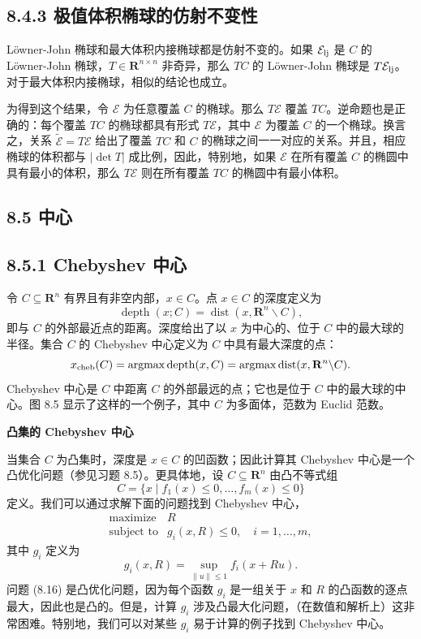 \documentclass[UTF8, 12pt, fontset=fandol, oneside]{ctexart}
\begin{document}
\subsection*{8.4.3 极值体积椭球的仿射不变性}

Löwner-John 椭球和最大体积内接椭球都是仿射不变的。如果 $\mathcal{E}_{\rm lj}$ 是 $C$ 的 Löwner-John 椭球，$T\in\mathbf{R}^{n\times n}$ 非奇异，那么 $TC$ 的 Löwner-John 椭球是 $T\mathcal{E}_{\rm lj}$。对于最大体积内接椭球，相似的结论也成立。

为得到这个结果，令 $\mathcal{E}$ 为任意覆盖 $C$ 的椭球。那么 $T\mathcal{E}$ 覆盖 $TC$。逆命题也是正确的：每个覆盖 $TC$ 的椭球都具有形式 $T\mathcal{E}$，其中 $\mathcal{E}$ 为覆盖 $C$ 的一个椭球。换言之，关系 $\tilde{\mathcal{E}}=T\mathcal{E}$ 给出了覆盖 $TC$ 和 $C$ 的椭球之间一一对应的关系。并且，相应椭球的体积都与 $|\det T|$ 成比例，因此，特别地，如果 $\mathcal{E}$ 在所有覆盖 $C$ 的椭圆中具有最小的体积，那么 $T\mathcal{E}$ 则在所有覆盖 $TC$ 的椭圆中有最小体积。

\subsection*{8.5 中心}

\subsection*{8.5.1 Chebyshev 中心}

令 $C\subseteq\mathbf{R}^n$ 有界且有非空内部，$x\in C$。点 $x\in C$ 的深度定义为
\[
\operatorname{depth}(x;C)=\operatorname{dist}(x,\mathbf{R}^n\backslash C),
\]
即与 $C$ 的外部最近点的距离。深度给出了以 $x$ 为中心的、位于 $C$ 中的最大球的半径。集合 $C$ 的 Chebyshev 中心定义为 $C$ 中具有最大深度的点：
\[
x_{\rm cheb}(C)=\mathop{\rm argmax}\operatorname{depth}(x,C)
=\mathop{\rm argmax}\operatorname{dist}(x,\mathbf{R}^n\backslash C).
\]
Chebyshev 中心是 $C$ 中距离 $C$ 的外部最远的点；它也是位于 $C$ 中的最大球的中心。图 8.5 显示了这样的一个例子，其中 $C$ 为多面体，范数为 Euclid 范数。

\noindent\textbf{凸集的 Chebyshev 中心}

当集合 $C$ 为凸集时，深度是 $x\in C$ 的凹函数；因此计算其 Chebyshev 中心是一个凸优化问题（参见习题 8.5）。更具体地，设 $C\subseteq\mathbf{R}^n$ 由凸不等式组
\[
C=\{x\mid f_1(x)\leq 0,\ldots,f_m(x)\leq 0\}
\]
定义。我们可以通过求解下面的问题找到 Chebyshev 中心，
\[
\begin{array}{ll}
\mbox{maximize} & R\\
\mbox{subject to} & g_i(x,R)\leq 0,\quad i=1,\ldots,m,
\end{array}
\tag{8.16}
\]
其中 $g_i$ 定义为
\[
g_i(x,R)=\sup_{\|u\|\leq 1} f_i(x+Ru).
\]
问题 (8.16) 是凸优化问题，因为每个函数 $g_i$ 是一组关于 $x$ 和 $R$ 的凸函数的逐点最大，因此也是凸的。但是，计算 $g_i$ 涉及凸最大化问题，（在数值和解析上）这非常困难。特别地，我们可以对某些 $g_i$ 易于计算的例子找到 Chebyshev 中心。
\end{document}
